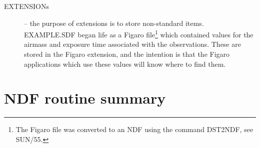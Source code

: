\documentclass[twoside,11pt]{article}
\renewcommand{\_}{{\tt\char'137}}
\newcommand{\xref}[3]{#1}
\newcommand{\xlabel}[1]{}
\begin{document}
\begin{description}
\item[{EXTENSIONs}] -- the purpose of extensions is to store non-standard
items. EXAMPLE.SDF began life as a Figaro file\footnote{The Figaro file was 
converted to an NDF using the command DST2NDF, see \xref{SUN/55}{sun55}{}.}
which contained values
for the airmass and exposure time associated with the observations.
These are stored in the Figaro extension, and the intention is that the
Figaro applications which 
use these values will know where to find them.
\end{description}

\newpage
\newcommand{\japp}[2]{\item{\tt\hspace*{-5mm} #1} -- {#2}}
\section{NDF routine summary\label{apxrod}\xlabel{ndf_routine_summary}}
\end{document}
